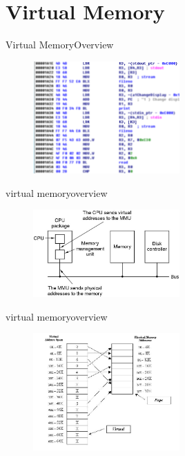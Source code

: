 \documentclass[10pt]{beamer}
\begin{document}
\section{Virtual Memory}
\begin{frame}{Virtual Memory}{Overview}
  \begin{figure}[ht]
    \centering
    \includegraphics[width=0.5\textwidth, keepaspectratio=true]{images/assembly_code_load_from_memory.png}
  \end{figure}
\end{frame}

\begin{frame}{virtual memory}{overview}
  \begin{figure}[ht]
    \centering
    \includegraphics[width=0.5\textwidth, keepaspectratio=true]{images/mmu_cpu.png}
  \end{figure}
\end{frame}

\begin{frame}{virtual memory}{overview}
  \begin{figure}[ht]
    \centering
    \includegraphics[width=0.5\textwidth, keepaspectratio=true]{images/virtual_memory.png}
  \end{figure}
\end{frame}

{\1
\begin{frame}
\end{frame}}
\end{document}
